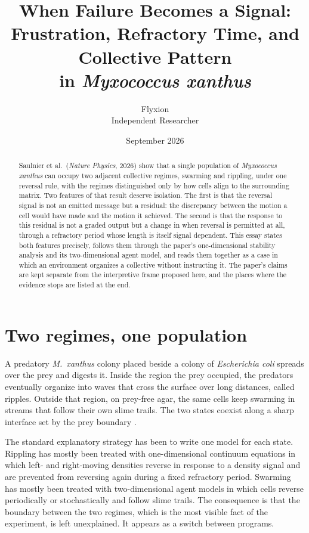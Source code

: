 \documentclass[11pt]{article}
\title{When Failure Becomes a Signal:\\
Frustration, Refractory Time, and Collective Pattern\\
in \emph{Myxococcus xanthus}}
\author{Flyxion\\\small Independent Researcher}
\date{September 2026}
\theoremstyle{definition}
\theoremstyle{remark}
\begin{document}
\maketitle

\begin{abstract}
\noindent
Saulnier et al.\ (\textit{Nature Physics}, 2026) show that a single population of \emph{Myxococcus xanthus} can occupy two adjacent collective regimes, swarming and rippling, under one reversal rule, with the regimes distinguished only by how cells align to the surrounding matrix. Two features of that result deserve isolation. The first is that the reversal signal is not an emitted message but a residual: the discrepancy between the motion a cell would have made and the motion it achieved. The second is that the response to this residual is not a graded output but a change in when reversal is permitted at all, through a refractory period whose length is itself signal dependent. This essay states both features precisely, follows them through the paper's one-dimensional stability analysis and its two-dimensional agent model, and reads them together as a case in which an environment organizes a collective without instructing it. The paper's claims are kept separate from the interpretive frame proposed here, and the places where the evidence stops are listed at the end.
\end{abstract}

\section{Two regimes, one population}

A predatory \emph{M.\ xanthus} colony placed beside a colony of \emph{Escherichia coli} spreads over the prey and digests it. Inside the region the prey occupied, the predators eventually organize into waves that cross the surface over long distances, called ripples. Outside that region, on prey-free agar, the same cells keep swarming in streams that follow their own slime trails. The two states coexist along a sharp interface set by the prey boundary \cite{saulnier2026}.

The standard explanatory strategy has been to write one model for each state. Rippling has mostly been treated with one-dimensional continuum equations in which left- and right-moving densities reverse in response to a density signal and are prevented from reversing again during a fixed refractory period. Swarming has mostly been treated with two-dimensional agent models in which cells reverse periodically or stochastically and follow slime trails. The consequence is that the boundary between the two regimes, which is the most visible fact of the experiment, is left unexplained. It appears as a switch between programs.
\end{document}
